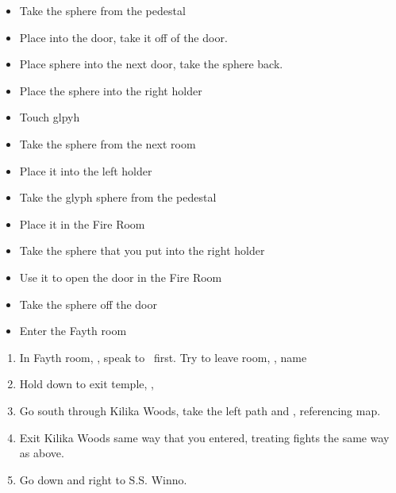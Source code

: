 \begin{trial}
  \begin{itemize}
    \item Take the sphere from the pedestal
    \item Place into the door, take it off of the door.
    \item Place sphere into the next door, take the sphere back.
    \item Place the sphere into the right holder
    \item Touch glpyh
    \item Take the sphere from the next room
    \item Place it into the left holder
    \item Take the glyph sphere from the pedestal
    \item Place it in the Fire Room
    \item Take the sphere that you put into the right holder
    \item Use it to open the door in the Fire Room
    \item Take the sphere off the door
    \item Enter the Fayth room
  \end{itemize}
\end{trial}
\begin{enumerate}[resume]
  \item In Fayth room, \sd, speak to \wakka\ first. Try to leave room, \sd, name \ifrit
  \item Hold down to exit temple, \cs[0:40], \sd
  \item Go south through Kilika Woods, take the left path and , referencing map.
  \item Exit Kilika Woods same way that you entered, treating fights the same way as above.
  \item Go down and right to S.S. Winno. \sd
\end{enumerate}